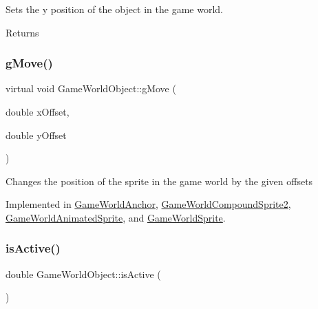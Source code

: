 Sets the y position of the object in the game world. 

\begin{DoxyReturn}{Returns}

\end{DoxyReturn}
\mbox{\label{class_game_world_object_a3ddbcf57e6eb43cb4aaec7ac347d4e17}} 
\subsubsection{\texorpdfstring{g\+Move()}{gMove()}}
{\footnotesize\ttfamily virtual void Game\+World\+Object\+::g\+Move (\begin{DoxyParamCaption}\item[{double}]{x\+Offset,  }\item[{double}]{y\+Offset }\end{DoxyParamCaption})\hspace{0.3cm}{\ttfamily [pure virtual]}}



Changes the position of the sprite in the game world by the given offsets



Implemented in \hyperlink{class_game_world_anchor_a35bafca13929710c6138950c7c38ec71}{Game\+World\+Anchor}, \hyperlink{class_game_world_compound_sprite2_aa45dc19c6010d86e90832f129dd1e327}{Game\+World\+Compound\+Sprite2}, \hyperlink{class_game_world_animated_sprite_ac1aa0ef5ec1a3278934238ea214624a4}{Game\+World\+Animated\+Sprite}, and \hyperlink{class_game_world_sprite_ad2374a50582a6eb9e4da3cd2115dad08}{Game\+World\+Sprite}.

\mbox{\label{class_game_world_object_a2c44a748bb3070545761d7e7c22c7f99}} 
\subsubsection{\texorpdfstring{is\+Active()}{isActive()}}
{\footnotesize\ttfamily double Game\+World\+Object\+::is\+Active (\begin{DoxyParamCaption}{ }\end{DoxyParamCaption})}



